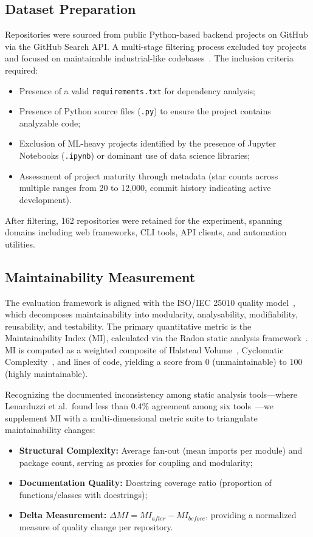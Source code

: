 \documentclass[sigconf,review,anonymous]{acmart}
\begin{document}
\subsection{Dataset Preparation}
Repositories were sourced from public Python-based backend projects on GitHub via the GitHub Search API. A multi-stage filtering process excluded toy projects and focused on maintainable industrial-like codebases~\cite{rahmati2021ensuring}. The inclusion criteria required:
\begin{itemize}[nosep]
    \item Presence of a valid \texttt{requirements.txt} for dependency analysis;
    \item Presence of Python source files (\texttt{.py}) to ensure the project contains analyzable code;
    \item Exclusion of ML-heavy projects identified by the presence of Jupyter Notebooks (\texttt{.ipynb}) or dominant use of data science libraries;
    \item Assessment of project maturity through metadata (star counts across multiple ranges from 20 to 12{,}000, commit history indicating active development).
\end{itemize}
After filtering, 162 repositories were retained for the experiment, spanning domains including web frameworks, CLI tools, API clients, and automation utilities.

\subsection{Maintainability Measurement}
The evaluation framework is aligned with the ISO/IEC 25010 quality model~\cite{ISO25010}, which decomposes maintainability into modularity, analysability, modifiability, reusability, and testability. The primary quantitative metric is the Maintainability Index (MI), calculated via the Radon static analysis framework~\cite{oman1992maintainability}. MI is computed as a weighted composite of Halstead Volume~\cite{halstead1977elements}, Cyclomatic Complexity~\cite{mccabe1976complexity}, and lines of code, yielding a score from 0 (unmaintainable) to 100 (highly maintainable).

Recognizing the documented inconsistency among static analysis tools---where Lenarduzzi et al.\ found less than 0.4\% agreement among six tools~\cite{lenarduzzi2023critical}---we supplement MI with a multi-dimensional metric suite to triangulate maintainability changes:
\begin{itemize}[nosep]
    \item \textbf{Structural Complexity:} Average fan-out (mean imports per module) and package count, serving as proxies for coupling and modularity;
    \item \textbf{Documentation Quality:} Docstring coverage ratio (proportion of functions/classes with docstrings);
    \item \textbf{Delta Measurement:} $\Delta MI = MI_{after} - MI_{before}$, providing a normalized measure of quality change per repository.
\end{itemize}
\end{document}
